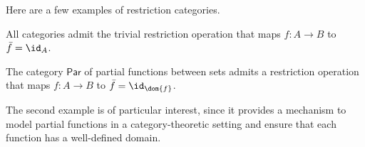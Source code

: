 \step
\begin{examples}
  Here are a few examples of restriction categories.~\cite{CATEGORY-THEORY-TEXT}
  \begin{enumarabic}
    \item All categories admit the trivial restriction operation
      that maps $f : A \to B$ to $\bar{f} = \id_{A}$.
    \item The category $\mathsf{Par}$ of partial functions between sets
      admits a restriction operation that maps
      $f : A \to B$ to $\bar{f} = \id_{\dom{f}}$.
  \end{enumarabic}

  The second example is of particular interest, since it provides a mechanism
  to model partial functions in a category-theoretic setting
  and ensure that each function has a well-defined domain.
\end{examples}
